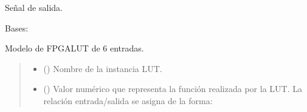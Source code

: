 \documentclass[letterpaper,10pt,english]{sphinxmanual}
\begin{document}
\begin{fulllineitems}
\begin{fulllineitems}
\end{fulllineitems}


\begin{fulllineitems}
\label{\detokenize{fpga:fpga.Lut4.w_out}}
\pysigstartsignatures
{}
\pysigstopsignatures
\sphinxAtStartPar
Señal de salida.

\end{fulllineitems}


\end{fulllineitems}


\begin{fulllineitems}
\label{\detokenize{fpga:fpga.Lut6}}
\pysigstartsignatures
{}
\pysigstopsignatures
\sphinxAtStartPar
Bases: 

\sphinxAtStartPar
Modelo de FPGA\sphinxhyphen{}LUT de 6 entradas.
\begin{quote}\begin{description}
\begin{itemize}
\item {} 
\sphinxAtStartPar
{} () \textendash{} Nombre de la instancia LUT.

\item {} 
\sphinxAtStartPar
{} () \textendash{} 
\sphinxAtStartPar
Valor numérico que representa la función realizada por la LUT. La relación entrada/salida se asigna de la forma:



\end{itemize}
\end{description}
\end{quote}
\end{fulllineitems}
\end{document}
